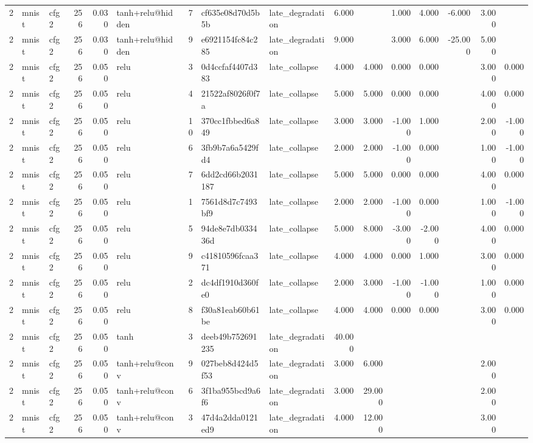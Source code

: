 \begin{table}[htbp]
{\begin{tabular}{@{}rllrrlrllrrrrrrr@{}}
2 & mnist & cfg2 & 256 & 0.030 & tanh+relu@hidden & 7 & cf635e08d70d5b5b & late\_degradation & 6.000 &  & 1.000 & 4.000 & -6.000 & 3.000 &  \\
2 & mnist & cfg2 & 256 & 0.030 & tanh+relu@hidden & 9 & e6921154fc84c285 & late\_degradation & 9.000 &  & 3.000 & 6.000 & -25.000 & 5.000 &  \\
2 & mnist & cfg2 & 256 & 0.050 & relu & 3 & 0d4ccfaf4407d383 & late\_collapse & 4.000 & 4.000 & 0.000 & 0.000 &  & 3.000 & 0.000 \\
2 & mnist & cfg2 & 256 & 0.050 & relu & 4 & 21522af8026f0f7a & late\_collapse & 5.000 & 5.000 & 0.000 & 0.000 &  & 4.000 & 0.000 \\
2 & mnist & cfg2 & 256 & 0.050 & relu & 10 & 370cc1fbbed6a849 & late\_collapse & 3.000 & 3.000 & -1.000 & 1.000 &  & 2.000 & -1.000 \\
2 & mnist & cfg2 & 256 & 0.050 & relu & 6 & 3fb9b7a6a5429fd4 & late\_collapse & 2.000 & 2.000 & -1.000 & 0.000 &  & 1.000 & -1.000 \\
2 & mnist & cfg2 & 256 & 0.050 & relu & 7 & 6dd2cd66b2031187 & late\_collapse & 5.000 & 5.000 & 0.000 & 0.000 &  & 4.000 & 0.000 \\
2 & mnist & cfg2 & 256 & 0.050 & relu & 1 & 7561d8d7c7493bf9 & late\_collapse & 2.000 & 2.000 & -1.000 & 0.000 &  & 1.000 & -1.000 \\
2 & mnist & cfg2 & 256 & 0.050 & relu & 5 & 94de8e7db033436d & late\_collapse & 5.000 & 8.000 & -3.000 & -2.000 &  & 4.000 & 0.000 \\
2 & mnist & cfg2 & 256 & 0.050 & relu & 9 & c41810596fcaa371 & late\_collapse & 4.000 & 4.000 & 0.000 & 1.000 &  & 3.000 & 0.000 \\
2 & mnist & cfg2 & 256 & 0.050 & relu & 2 & dc4df1910d360fe0 & late\_collapse & 2.000 & 3.000 & -1.000 & -1.000 &  & 1.000 & 0.000 \\
2 & mnist & cfg2 & 256 & 0.050 & relu & 8 & f30a81eab60b61be & late\_collapse & 4.000 & 4.000 & 0.000 & 0.000 &  & 3.000 & 0.000 \\
2 & mnist & cfg2 & 256 & 0.050 & tanh & 3 & deeb49b752691235 & late\_degradation & 40.000 &  &  &  &  &  &  \\
2 & mnist & cfg2 & 256 & 0.050 & tanh+relu@conv & 9 & 027beb8d424d5f53 & late\_degradation & 3.000 & 6.000 &  &  &  & 2.000 &  \\
2 & mnist & cfg2 & 256 & 0.050 & tanh+relu@conv & 6 & 3f1ba955bcd9a6f6 & late\_degradation & 3.000 & 29.000 &  &  &  & 2.000 &  \\
2 & mnist & cfg2 & 256 & 0.050 & tanh+relu@conv & 3 & 47d4a2dda0121ed9 & late\_degradation & 4.000 & 12.000 &  &  &  & 3.000 &  \\

\end{tabular}}
\end{table}

